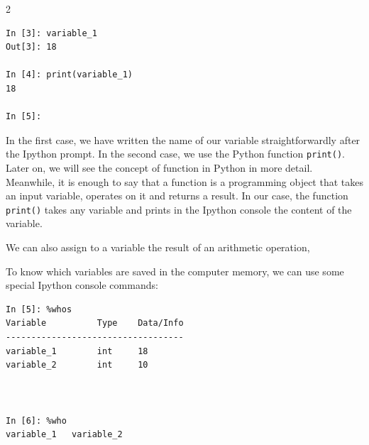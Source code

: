 \begin{paracol}{2}
\begin{verbatim}
In [3]: variable_1
Out[3]: 18

In [4]: print(variable_1)
18

In [5]: 
\end{verbatim}
In the first case, we have written the name of our variable straightforwardly after the Ipython prompt. In the second case,  we use the Python function \texttt{print()}. Later on, we will see the concept of function in Python in more detail. Meanwhile, it is enough to say that a function is a programming object that takes an input variable, operates on it and returns a result. In our case, the function \texttt{print()} takes any variable and prints in the Ipython console the content of the variable.

We can also assign to a variable the result of an arithmetic operation,

To know which variables are saved in the computer memory, we can use some special Ipython console commands:
\end{paracol}

\begin{center}
\begin{minipage}{0.4\textwidth}
\begin{verbatim}
In [5]: %whos
Variable          Type    Data/Info
-----------------------------------
variable_1        int     18
variable_2        int     10



In [6]: %who
variable_1	 variable_2    
\end{verbatim}
\end{minipage}
\end{center}

